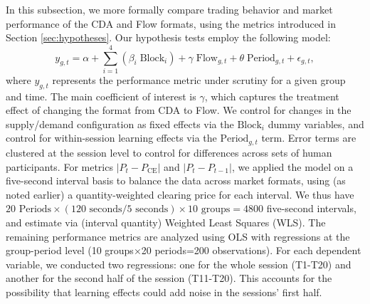 In this subsection, we more formally compare  trading behavior and market performance of the CDA and Flow formats, using the metrics introduced in Section \ref{sec:hypotheses}.
Our hypothesis tests %
employ the following model:
\begin{equation} \label{eq:reg}
    y_{g,t} = \alpha + \sum^{4}_{i = 1} \left(\beta_i \; \text{Block}_i\right) + \gamma \; \text{Flow}_{g,t} + \theta \; \text{Period}_{g,t} + \epsilon_{g,t},
\end{equation}
where $y_{g,t}$ represents the performance metric under scrutiny for a given group and time. 
The main coefficient of interest is $\gamma$, which captures the treatment effect of changing the format from CDA to Flow.
We control for changes in the supply/demand configuration as fixed effects via the $\text{Block}_i$ dummy variables,
and control for within-session learning effects via the $\text{Period}_{g,t}$ term. 
Error terms are clustered at the session level to control for differences across sets of human participants.
For metrics $\lvert P_t - P_{\text{CE}}\rvert$ and $\lvert P_{t} - P_{t - 1}\rvert$, we applied the model on a five-second interval basis to balance the data across market formats, using (as noted earlier) a quantity-weighted clearing price for each interval. %
We thus have $20 \text{ Periods} \times (120 \text{ seconds} / 5 \text{ seconds}) \times 10 \text{ groups}= 4800$ five-second intervals, and 
estimate via (interval quantity) Weighted Least Squares (WLS). 
The remaining performance metrics are analyzed using OLS with regressions at the group-period level (10 groups×20 periods=200 observations). 
For each dependent variable, we conducted two regressions: one for the whole session (T1-T20) and another for the second half of the session (T11-T20). This accounts for the possibility that learning effects could add noise in the sessions' first half. 


